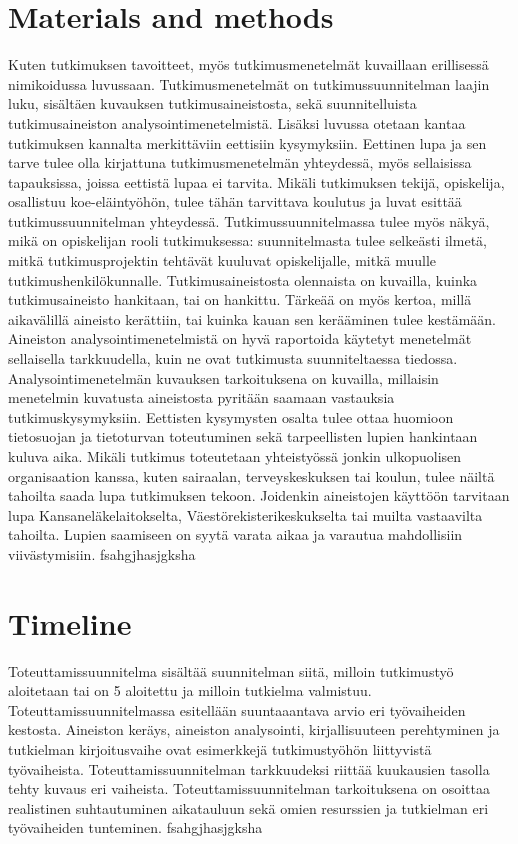 \documentclass[a4paper,12pt]{report}
\begin{document}
\section{Materials and methods}
Kuten tutkimuksen tavoitteet, myös tutkimusmenetelmät kuvaillaan erillisessä
nimikoidussa luvussaan. Tutkimusmenetelmät on tutkimussuunnitelman laajin luku,
sisältäen kuvauksen tutkimusaineistosta, sekä suunnitelluista tutkimusaineiston
analysointimenetelmistä. Lisäksi luvussa otetaan kantaa tutkimuksen kannalta merkittäviin
eettisiin kysymyksiin. Eettinen lupa ja sen tarve tulee olla kirjattuna tutkimusmenetelmän
yhteydessä, myös sellaisissa tapauksissa, joissa eettistä lupaa ei tarvita. Mikäli tutkimuksen
tekijä, opiskelija, osallistuu koe-eläintyöhön, tulee tähän tarvittava koulutus ja luvat esittää
tutkimussuunnitelman yhteydessä. Tutkimussuunnitelmassa tulee myös näkyä, mikä on
opiskelijan rooli tutkimuksessa: suunnitelmasta tulee selkeästi ilmetä, mitkä
tutkimusprojektin tehtävät kuuluvat opiskelijalle, mitkä muulle tutkimushenkilökunnalle. 
Tutkimusaineistosta olennaista on kuvailla, kuinka tutkimusaineisto hankitaan, tai on
hankittu. Tärkeää on myös kertoa, millä aikavälillä aineisto kerättiin, tai kuinka kauan sen
kerääminen tulee kestämään. Aineiston analysointimenetelmistä on hyvä raportoida
käytetyt menetelmät sellaisella tarkkuudella, kuin ne ovat tutkimusta suunniteltaessa
tiedossa. Analysointimenetelmän kuvauksen tarkoituksena on kuvailla, millaisin
menetelmin kuvatusta aineistosta pyritään saamaan vastauksia tutkimuskysymyksiin.
Eettisten kysymysten osalta tulee ottaa huomioon tietosuojan ja tietoturvan toteutuminen
sekä tarpeellisten lupien hankintaan kuluva aika. Mikäli tutkimus toteutetaan yhteistyössä
jonkin ulkopuolisen organisaation kanssa, kuten sairaalan, terveyskeskuksen tai koulun,
tulee näiltä tahoilta saada lupa tutkimuksen tekoon. Joidenkin aineistojen käyttöön tarvitaan
lupa Kansaneläkelaitokselta, Väestörekisterikeskukselta tai muilta vastaavilta tahoilta.
Lupien saamiseen on syytä varata aikaa ja varautua mahdollisiin viivästymisiin. 
fsahgjhasjgksha

\section{Timeline}
Toteuttamissuunnitelma sisältää suunnitelman siitä, milloin tutkimustyö aloitetaan tai on 
5
aloitettu ja milloin tutkielma valmistuu. Toteuttamissuunnitelmassa esitellään suuntaaantava arvio eri työvaiheiden kestosta. Aineiston keräys, aineiston analysointi,
kirjallisuuteen perehtyminen ja tutkielman kirjoitusvaihe ovat esimerkkejä tutkimustyöhön
liittyvistä työvaiheista. Toteuttamissuunnitelman tarkkuudeksi riittää kuukausien tasolla
tehty kuvaus eri vaiheista. Toteuttamissuunnitelman tarkoituksena on osoittaa realistinen
suhtautuminen aikatauluun sekä omien resurssien ja tutkielman eri työvaiheiden
tunteminen. 
fsahgjhasjgksha
\end{document}
